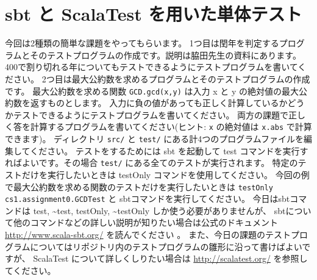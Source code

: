 \documentclass[a4paper]{article}
\begin{document}
\section{sbt と ScalaTest を用いた単体テスト}

今回は2種類の簡単な課題をやってもらいます。
1つ目は閏年を判定するプログラムとそのテストプログラムの作成です。説明は脇田先生の資料にあります。
400で割り切れる年についてもテストできるようにテストプログラムを書いてください。
2つ目は最大公約数を求めるプログラムとそのテストプログラムの作成です。
最大公約数を求める関数 \texttt{GCD.gcd(x,y)} は入力 x と y の絶対値の最大公約数を返すものとします。
入力に負の値があっても正しく計算しているかどうかテストできるようにテストプログラムを書いてください。
両方の課題で正しく答を計算するプログラムを書いてください(ヒント: \texttt{x} の絶対値は \texttt{x.abs} で計算できます)。
ディレクトリ \texttt{src/} と \texttt{test/} にある計4つのプログラムファイルを編集してください。
テストをするためには sbt を起動して test コマンドを実行すればよいです。その場合 \texttt{test/} にある全てのテストが実行されます。
特定のテストだけを実行したいときは testOnly コマンドを使用してください。
今回の例で最大公約数を求める関数のテストだけを実行したいときは \texttt{testOnly cs1.assignment0.GCDTest} と sbtコマンドを実行してください。
今日はsbtコマンドは test, \~{}test, testOnly, \~{}testOnly しか使う必要がありませんが、
sbtについて他のコマンドなどの詳しい説明が知りたい場合は公式のドキュメント \url{http://www.scala-sbt.org/} を読んでください 。
また、今日の課題のテストプログラムについてはリポジトリ内のテストプログラムの雛形に沿って書けばよいですが、
ScalaTest について詳しくしりたい場合は \url{http://scalatest.org/} を参照してください。

\end{document}
